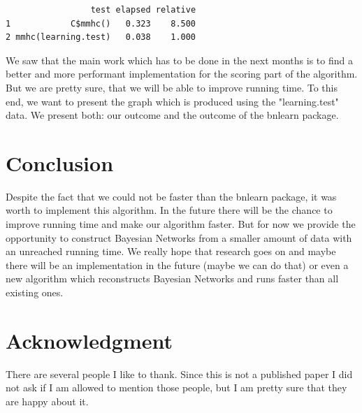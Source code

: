   	\begin{verbatim}
                 test elapsed relative
1            C$mmhc()   0.323    8.500
2 mmhc(learning.test)   0.038    1.000
 	\end{verbatim}

 	We saw that the main work which has to be done in the next months is to find a better and more performant implementation for the scoring part of the algorithm. But we are pretty sure, that we will be able to improve running time. To this end, we want to present the graph which is produced using the "learning.test" data. We present both: our outcome and the outcome of the bnlearn package.



\chapter{Conclusion}

	Despite the fact that we could not be faster than the bnlearn package, it was worth to implement this algorithm. In the future there will be the chance to improve running time and make our algorithm faster. But for now we provide the opportunity to construct Bayesian Networks from a smaller amount of data with an unreached running time. We really hope that research goes on and maybe there will be an implementation in the future (maybe we can do that) or even a new algorithm which reconstructs Bayesian Networks and runs faster than all existing ones.

\chapter*{Acknowledgment}

	There are several people I like to thank. Since this is not a published paper I did not ask if I am allowed to mention those people, but I am pretty sure that they are happy about it.


